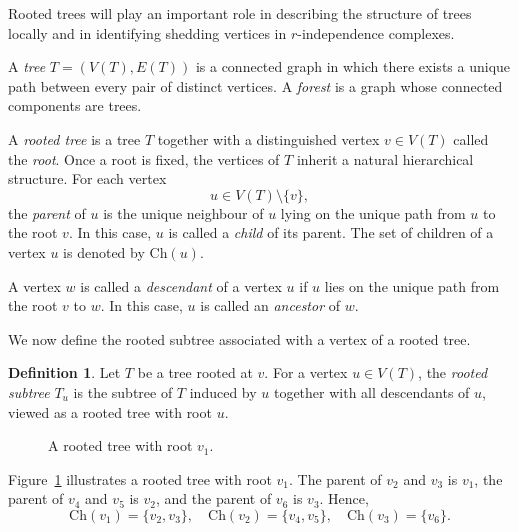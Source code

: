 \documentclass[12pt,reqno]{amsart}
\theoremstyle{definition}
\newtheorem{definition}[theorem]{Definition}
\def\Ch{\mathrm{Ch}}
\begin{document}
Rooted trees will play an important role in describing the structure of trees locally and in identifying shedding vertices in $r$-independence complexes.


A \emph{tree} $T=(V(T),E(T))$ is a connected graph in which there exists a unique path between every pair of distinct vertices. A \emph{forest} is a graph whose connected components are trees.

A \emph{rooted tree} is a tree $T$ together with a distinguished vertex $v \in V(T)$ called the \emph{root}. Once a root is fixed, the vertices of $T$ inherit a natural hierarchical structure. For each vertex 
\[
u \in V(T)\setminus\{v\},
\]
the \emph{parent} of $u$ is the unique neighbour of $u$ lying on the unique path from $u$ to the root $v$. In this case, $u$ is called a \emph{child} of its parent. The set of children of a vertex $u$ is denoted by $\Ch(u)$. 

A vertex $w$ is called a \emph{descendant} of a vertex $u$ if $u$ lies on the unique path from the root $v$ to $w$. In this case, $u$ is called an \emph{ancestor} of $w$.

We now define the rooted subtree associated with a vertex of a rooted tree.

\begin{definition}\label{def: rooted subtree}
Let $T$ be a tree rooted at $v$. For a vertex $u \in V(T)$, the \emph{rooted subtree} $T_u$ is the subtree of $T$ induced by $u$ together with all descendants of $u$, viewed as a rooted tree with root $u$.
\end{definition}

\begin{figure}[H]
\centering
{}
\caption{A rooted tree with root $v_1$.}
\label{fig: tree1}
\end{figure}

Figure~\ref{fig: tree1} illustrates a rooted tree with root $v_1$. The parent of $v_2$ and $v_3$ is $v_1$, the parent of $v_4$ and $v_5$ is $v_2$, and the parent of $v_6$ is $v_3$. Hence,
\[
\mathrm{Ch}(v_1)=\{v_2,v_3\}, \quad 
\mathrm{Ch}(v_2)=\{v_4,v_5\}, \quad 
\mathrm{Ch}(v_3)=\{v_6\}.
\]
\end{document}
